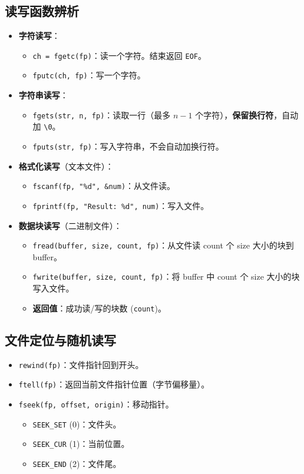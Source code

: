\documentclass[a4paper,12pt]{article}
\begin{document}
\subsection{读写函数辨析}
\begin{itemize}
    \item \textbf{字符读写}：
    \begin{itemize}
        \item \texttt{ch = fgetc(fp)}：读一个字符。结束返回 \texttt{EOF}。
        \item \texttt{fputc(ch, fp)}：写一个字符。
    \end{itemize}
    \item \textbf{字符串读写}：
    \begin{itemize}
        \item \texttt{fgets(str, n, fp)}：读取一行（最多 $n-1$ 个字符），\textbf{保留换行符}，自动加 \texttt{\textbackslash 0}。
        \item \texttt{fputs(str, fp)}：写入字符串，不会自动加换行符。
    \end{itemize}
    \item \textbf{格式化读写}（文本文件）：
    \begin{itemize}
        \item \texttt{fscanf(fp, "\%d", \&num)}：从文件读。
        \item \texttt{fprintf(fp, "Result: \%d", num)}：写入文件。
    \end{itemize}
    \item \textbf{数据块读写}（二进制文件）：
    \begin{itemize}
        \item \texttt{fread(buffer, size, count, fp)}：从文件读 count 个 size 大小的块到 buffer。
        \item \texttt{fwrite(buffer, size, count, fp)}：将 buffer 中 count 个 size 大小的块写入文件。
        \item \textbf{返回值}：成功读/写的块数 (\texttt{count})。
    \end{itemize}
\end{itemize}

\subsection{文件定位与随机读写}
\begin{itemize}
    \item \texttt{rewind(fp)}：文件指针回到开头。
    \item \texttt{ftell(fp)}：返回当前文件指针位置（字节偏移量）。
    \item \texttt{fseek(fp, offset, origin)}：移动指针。
    \begin{itemize}
        \item \texttt{SEEK\_SET} (0)：文件头。
        \item \texttt{SEEK\_CUR} (1)：当前位置。
        \item \texttt{SEEK\_END} (2)：文件尾。
    \end{itemize}
\end{itemize}
\end{document}
